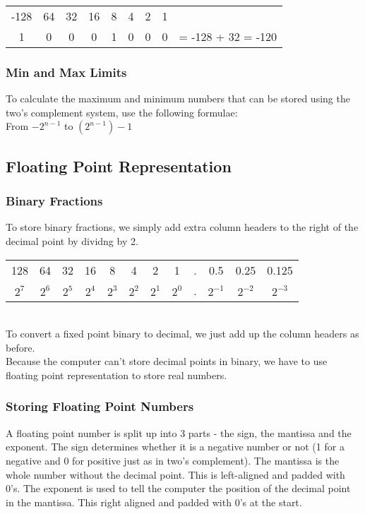 \documentclass[a4paper, 12pt]{report}
\begin{document}
\begin{tabular}{ccccccccl}
-128 & 64 & 32 & 16 & 8 & 4 & 2 & 1 & \\
1 & 0 & 0 & 0 & 1 & 0 & 0 & 0 & = -128 + 32 = -120\\
\end{tabular}

\subsubsection{Min and Max Limits}

To calculate the maximum and minimum numbers that can be stored using the two's complement system, use the following formulae: \\

From $-2^{n-1}$ to $(2^{n-1})-1$

\subsection{Floating Point Representation}

\subsubsection{Binary Fractions}

To store binary fractions, we simply add extra column headers to the right of the decimal point by dividng by 2. \\

\begin{tabular}{cccccccccccc}
128 & 64 & 32 & 16 & 8 & 4 & 2 & 1 & . & 0.5 & 0.25 & 0.125 \\
$2^{7}$ & $2^{6}$ & $2^{5}$ & $2^{4}$ & $2^{3}$ & $2^{2}$ & $2^{1}$ & $2^{0}$ & . & $2^{-1}$ & $2^{-2}$ & $2^{-3}$ \\
\end{tabular}\\

To convert a fixed point binary to decimal, we just add up the column headers as before. \\

Because the computer can't store decimal points in binary, we have to use floating point representation to store real numbers.

\subsubsection{Storing Floating Point Numbers}

A floating point number is split up into 3 parts - the sign, the mantissa and the exponent.  The sign determines whether it is a negative number or not (1 for a negative and 0 for positive just as in two's complement).  The mantissa is the whole number without the decimal point.  This is left-aligned and padded with 0's.  The exponent is used to tell the computer the position of the decimal point in the mantissa.  This right aligned and padded with 0's at the start. \\
\end{document}
